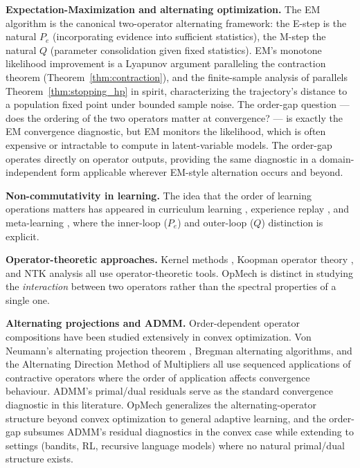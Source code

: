 \documentclass[12pt,a4paper]{article}
\begin{document}
\textbf{Expectation-Maximization and alternating optimization.}
The EM algorithm \citep{dempster1977em} is the canonical two-operator
alternating framework: the E-step is the natural $P_e$ (incorporating
evidence into sufficient statistics), the M-step the natural $Q$ (parameter
consolidation given fixed statistics). EM's monotone likelihood
improvement \citep{wu1983em} is a Lyapunov argument paralleling
the contraction theorem (Theorem~\ref{thm:contraction}), and the
finite-sample analysis of \citet{balakrishnan2017em} parallels
Theorem~\ref{thm:stopping_hp} in spirit, characterizing the trajectory's
distance to a population fixed point under bounded sample noise. The
order-gap question — does the ordering of the two operators matter at
convergence? — is exactly the EM convergence diagnostic, but EM monitors
the likelihood, which is often expensive or intractable to compute in
latent-variable models. The order-gap operates directly on operator outputs,
providing the same diagnostic in a domain-independent form applicable
wherever EM-style alternation occurs and beyond.

\textbf{Non-commutativity in learning.}
The idea that the order of learning operations matters has appeared in
curriculum learning \citep{bengio2009curriculum}, experience replay
\citep{schaul2016prioritized}, and meta-learning \citep{finn2017maml}, where
the inner-loop ($P_e$) and outer-loop ($Q$) distinction is explicit.

\textbf{Operator-theoretic approaches.}
Kernel methods \citep{scholkopf2002learning}, Koopman operator theory
\citep{brunton2022modern}, and NTK analysis \citep{jacot2018neural} all use
operator-theoretic tools. OpMech is distinct in studying the
\emph{interaction} between two operators rather than the spectral properties
of a single one.

\textbf{Alternating projections and ADMM.}
Order-dependent operator compositions have been studied extensively in convex
optimization. Von Neumann's alternating projection theorem
\citep[see][for a modern treatment]{bauschke1996projection}, Bregman
alternating algorithms, and the Alternating Direction Method of Multipliers
\citep{boyd2011admm} all use sequenced applications of contractive operators
where the order of application affects convergence behaviour. ADMM's
primal/dual residuals serve as the standard convergence diagnostic in this
literature. OpMech generalizes the alternating-operator structure beyond
convex optimization to general adaptive learning, and the order-gap subsumes
ADMM's residual diagnostics in the convex case while extending to settings
(bandits, RL, recursive language models) where no natural primal/dual
structure exists.
\end{document}
